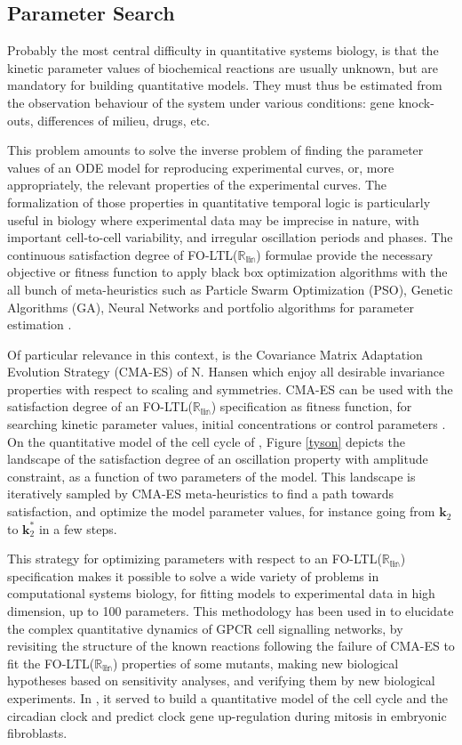 \documentclass[graybox]{svmult}
\newcommand{\vct}[1]{\bm{#1}}
\def\Rlin{\mathbb{R_{\mbox{lin}}}}
\begin{document}
\subsection{Parameter Search}\label{search}


Probably the most central difficulty in quantitative systems biology, is that the kinetic parameter values
of biochemical reactions are usually unknown, but are mandatory for building quantitative models.
They must thus be estimated from
the observation behaviour of the system under various conditions:
gene knock-outs, differences of milieu, drugs,  etc.

This problem amounts to solve the inverse problem
of finding the parameter values of an ODE model for reproducing experimental curves,
or, more appropriately, the relevant properties of the experimental curves.
The formalization of those properties in quantitative temporal logic
is particularly useful in biology where experimental data may be imprecise in nature,
with important cell-to-cell variability, and irregular oscillation periods and phases.
The continuous satisfaction degree of FO-LTL($\Rlin$) formulae 
provide the necessary objective or fitness function to apply black box optimization algorithms
with the all bunch of meta-heuristics \cite{SGH11ieee} such as Particle Swarm Optimization (PSO),
Genetic Algorithms (GA), Neural Networks
and portfolio algorithms for parameter estimation  \cite{Banga08bmc}.

Of particular relevance in this context, is the Covariance Matrix Adaptation Evolution Strategy (CMA-ES) of N. Hansen \cite{HO01ec}
which enjoy all desirable invariance properties
with respect to scaling and symmetries.
CMA-ES can be used with the satisfaction degree of an FO-LTL($\Rlin$) specification as fitness function,
for searching kinetic parameter values, initial concentrations or control parameters \cite{RBFS11tcs}.
On the quantitative model of the cell cycle of \cite{Tyson91pnas},
Figure \ref{tyson} depicts
the landscape of the satisfaction degree of an oscillation property with amplitude constraint,
as a function of two parameters of the model.
This landscape is iteratively sampled by CMA-ES meta-heuristics to find a path towards satisfaction,
and optimize the model parameter values,
for instance going from $\vct{k}_2$ to $\vct{k}_2^*$ in a few steps.


This strategy for optimizing parameters with respect to an FO-LTL($\Rlin$) specification
makes it possible to solve a wide variety of problems in computational systems biology,
for fitting models to experimental data in high dimension, up to 100 parameters.
This methodology has been used in  \cite{HDGRAKVDGPCPCFLR12msb}
to elucidate the complex quantitative dynamics of GPCR cell signalling networks,
by revisiting the structure of the known reactions following the failure of CMA-ES to fit the FO-LTL($\Rlin$) properties of some mutants,
making new biological hypotheses based on sensitivity analyses,
and verifying them by new biological experiments.
In \cite{TFSDF16biosystems}, it served to build  a quantitative model of the cell cycle and the circadian clock
and predict clock gene up-regulation during mitosis in embryonic fibroblasts.
\end{document}
